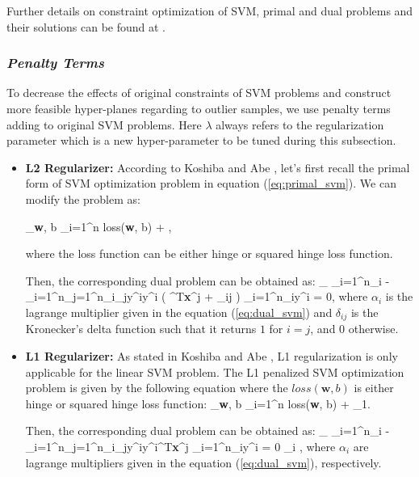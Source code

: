 Further details on constraint optimization of SVM, primal and dual problems and their solutions can be found at  \cite[pg.~13-19]{svm_book}.

\subsubsection*{\textit{Penalty Terms}}
To decrease the effects of original constraints of SVM problems and construct more feasible hyper-planes regarding to outlier samples, we use penalty terms adding to original SVM problems. Here $\lambda$ always refers to the regularization parameter which is a new hyper-parameter to be tuned during this subsection.

\begin{itemize}
	\item \textbf{L2 Regularizer:} According to Koshiba and  Abe \cite[pg.~2054-2059]{svm_penalty}, let's first recall the primal form of SVM optimization problem in equation (\ref{eq:primal_svm}). We can modify the problem as:
	
	\be
	\label{eq:l2_svm_primal}
	\min_{\textbf{w}, b} \sum_{i=1}^{n} loss(\textbf{w}, b) + \lambda {},
	\ee
	
	
	where the loss function can be either hinge or squared hinge loss function.
	
	Then, the corresponding dual problem can be obtained as:
	\be
	\label{eq:l2_svm_dual}
	\max_{\alpha} \sum_{i=1}^{n}\alpha_{i} - \sum_{i=1}^{n}\sum_{j=1}^{n}\alpha_{i}\alpha_{j}\:y^{i}y^{i} \big ( ^{T}\textbf{x}^{j} + \lambda \delta_{ij} \big ) \quad {} \:\:\sum_{i=1}^{n}\alpha_{i}y^{i} = 0\:,
	\ee
	where $\alpha_{i}$ is the lagrange multiplier given in the equation (\ref{eq:dual_svm}) and $\delta_{ij}$ is the Kronecker’s delta function such that it returns $1$ for $i=j$, and $0$ otherwise.
	
	\item \textbf{L1 Regularizer:}
	As stated in Koshiba and  Abe \cite[pg.~2054-2059]{svm_penalty}, L1 regularization is only applicable for the linear SVM problem. The L1 penalized SVM optimization problem is given by the following equation where the $loss(\textbf{w}, b)$ is either hinge or squared hinge loss function:
	\be
	\label{eq:l1_svm_primal}
	\min_{\textbf{w}, b} \sum_{i=1}^{n} loss(\textbf{w}, b) + \lambda  {}_{1}\:.
	\ee
	
	Then, the corresponding dual problem can be obtained as:
	\be
	\label{eq:l1_svm_dual}
	\max_{\alpha} \sum_{i=1}^{n}\alpha_{i} - \sum_{i=1}^{n}\sum_{j=1}^{n}\alpha_{i}\alpha_{j}\:y^{i}y^{i}^{T}\textbf{x}^{j} \quad  {} \:\:\sum_{i=1}^{n}\alpha_{i}y^{i} = 0 \:\:\:\: \alpha_{i} \leq {}\:,
	\ee
	where $\alpha_{i}$ are lagrange multipliers given in the equation (\ref{eq:dual_svm}), respectively.
	
	
\end{itemize}


